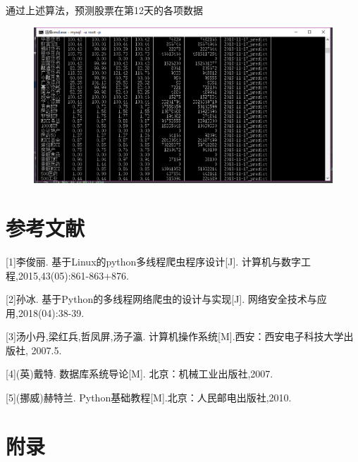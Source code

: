 \documentclass[UTF-8]{ctexart}
\begin{document}
通过上述算法，预测股票在第12天的各项数据

\begin{figure}[h]
  \centering
  \includegraphics[width=13cm]{8.png}
\end{figure}

\section{参考文献}

[1]李俊丽. 基于Linux的python多线程爬虫程序设计[J]. 计算机与数字工程,2015,43(05):861-863+876.

[2]孙冰. 基于Python的多线程网络爬虫的设计与实现[J]. 网络安全技术与应用,2018(04):38-39.

[3]汤小丹,梁红兵,哲凤屏,汤子瀛. 计算机操作系统[M].西安：西安电子科技大学出版社, 2007.5.

[4](英)戴特. 数据库系统导论[M]. 北京：机械工业出版社,2007.

[5](挪威)赫特兰. Python基础教程[M].北京：人民邮电出版社,2010.

\section{附录}
\end{document}
